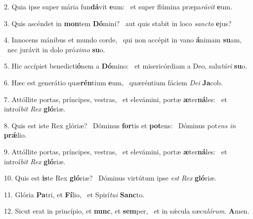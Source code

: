 2. Quia ipse super mária fun\textbf{dá}vit \textbf{e}um: \ast\  et super flúmina præpa\textit{rá}\textit{vit} \textbf{e}um.\

3. Quis ascéndet in \textbf{mon}tem \textbf{Dó}mini? \ast\  aut quis stabit in loco \textit{sanc}\textit{to} \textbf{e}jus?\

4. Innocens mánibus et mundo corde, \dag\  qui non accépit in vano \textbf{á}nimam \textbf{su}am, \ast\  nec jurávit in dolo pró\textit{xi}\textit{mo} \textbf{su}o.\

5. Hic accípiet benedicti\textbf{ó}nem a \textbf{Dó}mino: \ast\  et misericórdiam a Deo, salu\textit{tá}\textit{ri} \textbf{su}o.\

6. Hæc est generátio quæ\textbf{rén}tium \textbf{e}um, \ast\  quæréntium fáciem \textit{De}\textit{i} \textbf{Ja}cob.\

7. Attóllite portas, príncipes, vestras, \dag\  et elevámini, portæ \textbf{æ}ter\textbf{ná}les: \ast\  et introí\textit{bit} \textit{Rex} \textbf{gló}riæ.\

8. Quis est iste Rex glóriæ? \dag\  Dóminus \textbf{for}tis et \textbf{pot}ens: \ast\  Dóminus pot\textit{ens} \textit{in} \textbf{prǽ}lio.\

9. Attóllite portas, príncipes, vestras, \dag\  et elevámini, portæ \textbf{æ}ter\textbf{ná}les: \ast\  et introí\textit{bit} \textit{Rex} \textbf{gló}riæ.\

10. Quis est \textbf{is}te Rex \textbf{gló}riæ? \ast\  Dóminus virtútum ipse \textit{est} \textit{Rex} \textbf{gló}riæ.\

11. Glória \textbf{Pa}tri, et \textbf{Fí}lio, \ast\  et Spirí\textit{tu}\textit{i} \textbf{Sanc}to.\

12. Sicut erat in princípio, et \textbf{nunc}, et \textbf{sem}per, \ast\  et in sǽcula sæcu\textit{ló}\textit{rum}. \textbf{A}men.\

